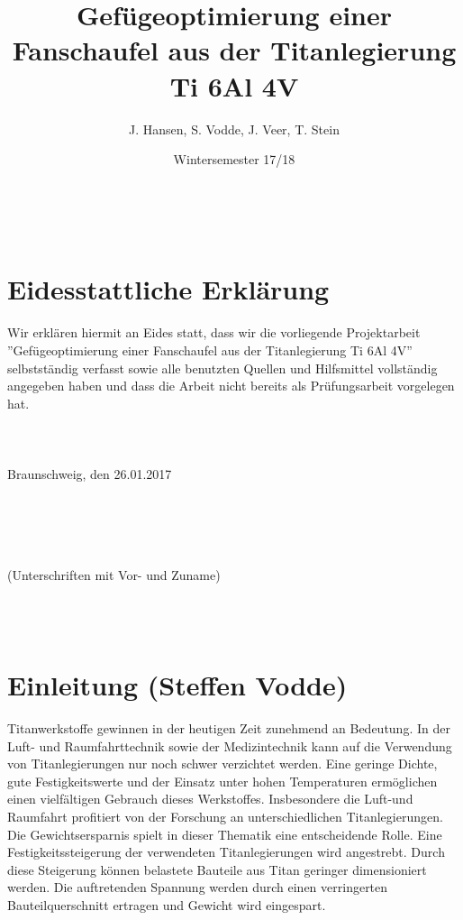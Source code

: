 \documentclass[a4paper, 11pt]{tubsreprt}
\title{Gefügeoptimierung einer Fanschaufel aus der Titanlegierung Ti 6Al 4V}
\date{Wintersemester 17/18}
\author{J. Hansen, S. Vodde,
 J. Veer, T. Stein}
\begin{document}
\maketitle
\ \\
\newpage


\chapter*{Eidesstattliche Erklärung}

Wir erklären hiermit an Eides statt, dass wir die vorliegende Projektarbeit ''Gefügeoptimierung einer Fanschaufel aus der Titanlegierung Ti 6Al 4V'' selbstständig verfasst sowie alle
benutzten Quellen und Hilfsmittel vollständig angegeben haben und dass die Arbeit nicht bereits als Prüfungsarbeit vorgelegen hat.\\

\ \\
\ \\
\ \\



Braunschweig, den 26.01.2017


\ \\
\ \\
\ \\
\ \\

(Unterschriften mit Vor- und Zuname) 

\ \\
\newpage
\ \\

\tableofcontents





\chapter*{Einleitung (Steffen Vodde)}
Titanwerkstoffe gewinnen in der heutigen Zeit zunehmend an Bedeutung. In der Luft- und Raumfahrttechnik sowie der Medizintechnik kann auf die Verwendung von Titanlegierungen nur noch schwer verzichtet werden. Eine geringe Dichte, gute Festigkeitswerte und der Einsatz unter hohen Temperaturen ermöglichen einen vielfältigen Gebrauch dieses Werkstoffes. Insbesondere die Luft-und Raumfahrt profitiert von der Forschung an unterschiedlichen Titanlegierungen. Die Gewichtsersparnis spielt in dieser Thematik eine entscheidende Rolle. Eine Festigkeitssteigerung der verwendeten Titanlegierungen wird angestrebt. Durch diese Steigerung können belastete Bauteile aus Titan geringer dimensioniert werden. Die auftretenden Spannung werden durch einen verringerten Bauteilquerschnitt ertragen und Gewicht wird eingespart. 
  
\end{document}
